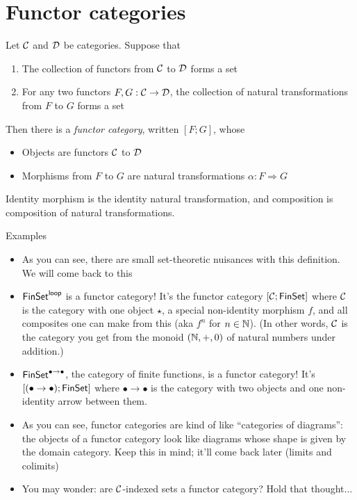 \section{Functor categories}

\begin{definition}
  Let \(\mathcal C\) and \(\mathcal D\) be categories.
  Suppose that
  \begin{enumerate}
    \item The collection of functors from \(\mathcal C\) to \(\mathcal D\) forms a set
    \item For any two functors \(F,G : \mathcal C \to \mathcal D\), the collection of natural transformations from \(F\) to \(G\) forms a set
  \end{enumerate}
  Then there is a \emph{functor category}, written \([F;G]\), whose
  \begin{itemize}
  \item Objects are functors \(\mathcal C\) to \(\mathcal D\)
  \item Morphisms from \(F\) to \(G\) are natural transformations \(\alpha : F \Rightarrow G\)
  \end{itemize}
  Identity morphism is the identity natural transformation, and composition is composition of natural transformations.
\end{definition}

Examples
\begin{itemize}
\item As you can see, there are small set-theoretic nuisances with this definition. We will come back to this
\item \(\mathsf{FinSet}^{\mathsf{loop}}\) is a functor category! It's the functor category \([\mathcal C;\mathsf{FinSet}]\) where \(\mathcal C\) is the
  category with one object \(\star\), a special non-identity morphism \(f\), and all composites one can make from this (aka \(f^n\) for \(n\in \mathbb N\)).
  (In other words, \(\mathcal C\) is the category you get from the monoid \((\mathbb N,+,0)\) of natural numbers under addition.)
\item \(\mathsf{FinSet}^{\bullet\to\bullet}\), the category of finite functions, is a functor category! It's \([(\bullet \to\bullet); \mathsf{FinSet}]\)
  where \(\bullet\to\bullet\) is the category with two objects and one non-identity arrow between them.
\item As you can see, functor categories are kind of like ``categories of diagrams'': the objects of a functor category look like
  diagrams whose shape is given by the domain category. Keep this in mind; it'll come back later (limits and colimits)
\item You may wonder: are \(\mathcal C\)-indexed sets a functor category? Hold that thought...
\end{itemize}

